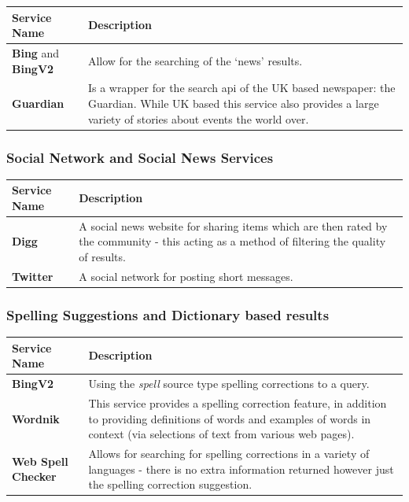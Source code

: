 \documentclass[letterpaper,10pt,english]{sphinxmanual}
\begin{document}
\begin{tabulary}{\linewidth}{|L|L|}
\hline
\textbf{
Service Name
} & \textbf{
Description
}\\\hline

\textbf{Bing} and \textbf{BingV2}
 & 
Allow for the searching of the `news' results.
\\\hline

\textbf{Guardian}
 & 
Is a wrapper for the search api of the UK based newspaper: the Guardian. While UK based this service also provides a large variety of stories about events the world over.
\\\hline
\end{tabulary}



\subsubsection{Social Network and Social News Services}
\label{overview:social-network-and-social-news-services}
\begin{tabulary}{\linewidth}{|L|L|}
\hline
\textbf{
Service Name
} & \textbf{
Description
}\\\hline

\textbf{Digg}
 & 
A social news website for sharing items which are then rated by the community - this acting as a method of filtering the quality of results.
\\\hline

\textbf{Twitter}
 & 
A social network for posting short messages.
\\\hline
\end{tabulary}



\subsubsection{Spelling Suggestions and Dictionary based results}
\label{overview:spelling-suggestions-and-dictionary-based-results}
\begin{tabulary}{\linewidth}{|L|L|}
\hline
\textbf{
Service Name
} & \textbf{
Description
}\\\hline

\textbf{BingV2}
 & 
Using the \emph{spell} source type spelling corrections to a query.
\\\hline

\textbf{Wordnik}
 & 
This service provides a spelling correction feature, in addition to providing definitions of words and examples of words in context (via selections of text from various web pages).
\\\hline

\textbf{Web Spell Checker}
 & 
Allows for searching for spelling corrections in a variety of languages - there is no extra information returned however just the spelling correction suggestion.
\\\hline
\end{tabulary}
\end{document}
